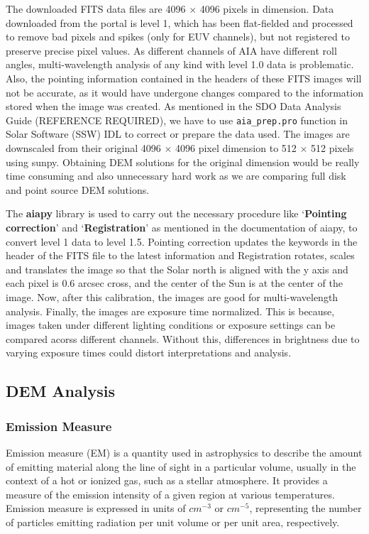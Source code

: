 The downloaded FITS data files are 4096 $\times$ 4096 pixels in dimension. Data downloaded from the portal is level 1, which has been flat-fielded and processed to remove bad pixels and spikes (only for EUV channels), but not registered to preserve precise pixel values. As different channels of AIA have different roll angles, multi-wavelength analysis of any kind with level 1.0 data is problematic. Also, the pointing information contained in the headers of these FITS images will not be accurate, as it would have undergone changes compared to the information stored when the image was created. As mentioned in the SDO Data Analysis Guide (REFERENCE REQUIRED), we have to use \texttt{aia\_prep.pro} function in Solar Software (SSW) IDL to correct or prepare the data used. The images are downscaled from their original 4096 $\times$ 4096 pixel dimension to 512 $\times$ 512 pixels using sunpy. Obtaining DEM solutions for the original dimension would be really time consuming and also unnecessary hard work as we are comparing full disk and point source DEM solutions.

The \textbf{aiapy} library is used to carry out the necessary procedure like `\textbf{Pointing correction}' and `\textbf{Registration}' as mentioned in the documentation of aiapy, to convert level 1 data to level 1.5. Pointing correction updates the keywords in the header of the FITS file to the latest information and Registration rotates, scales and translates the image so that the Solar north is aligned with the y axis and each pixel is 0.6 arcsec cross, and the center of the Sun is at the center of the image. Now, after this calibration, the images are good for multi-wavelength analysis. Finally, the images are exposure time normalized. This is because, images taken under different lighting conditions or exposure settings can be compared acorss different channels. Without this, differences in brightness due to varying exposure times could distort interpretations and analysis.

\subsection{DEM Analysis}

\subsubsection{Emission Measure}

Emission measure (EM) is a quantity used in astrophysics to describe the amount of emitting material along the line of sight in a particular volume, usually in the context of a hot or ionized gas, such as a stellar atmosphere. It provides a measure of the emission intensity of a given region at various temperatures. Emission measure is expressed in units of $cm^{-3}$ or $cm^{-5}$, representing the number of particles emitting radiation per unit volume or per unit area, respectively.

